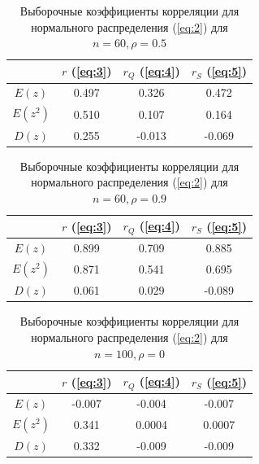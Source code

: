 \documentclass{article}
\begin{document}
\begin{table} [hb]
\begin{center}
\begin{tabular}{|c|c|c|c|}
\hline 
 & $r$ (\ref{eq:3}) & $r_Q$ (\ref{eq:4}) & $r_S$ (\ref{eq:5}) \\ 
\hline 
$E(z)$ & 0.497 & 0.326 & 0.472 \\
\hline 
$E(z^2)$ & 0.510 & 0.107 & 0.164 \\
\hline 
$D(z)$ & 0.255 & -0.013 & -0.069 \\
\hline 
\end{tabular} 
\caption{Выборочные коэффициенты корреляции для нормального распределения (\ref{eq:2}) для $n = 60, \rho = 0.5$}
\end{center}
\end{table}

\begin{table} [hb]
\begin{center}
\begin{tabular}{|c|c|c|c|}
\hline 
 & $r$ (\ref{eq:3}) & $r_Q$ (\ref{eq:4}) & $r_S$ (\ref{eq:5}) \\ 
\hline 
$E(z)$ & 0.899 & 0.709 & 0.885 \\
\hline 
$E(z^2)$ & 0.871 & 0.541 & 0.695 \\
\hline 
$D(z)$ & 0.061 & 0.029 & -0.089 \\
\hline 
\end{tabular} 
\caption{Выборочные коэффициенты корреляции для нормального распределения (\ref{eq:2}) для $n = 60, \rho = 0.9$}
\end{center}
\end{table}

\newpage
\begin{table} [hb]
\begin{center}
\begin{tabular}{|c|c|c|c|}
\hline 
 & $r$ (\ref{eq:3}) & $r_Q$ (\ref{eq:4}) & $r_S$ (\ref{eq:5}) \\ 
\hline 
$E(z)$ & -0.007 & -0.004 & -0.007 \\
\hline 
$E(z^2)$ & 0.341 & 0.0004 & 0.0007 \\
\hline 
$D(z)$ & 0.332 & -0.009 & -0.009 \\
\hline 
\end{tabular} 
\caption{Выборочные коэффициенты корреляции для нормального распределения (\ref{eq:2}) для $n = 100, \rho = 0$}
\end{center}
\end{table}
\end{document}
